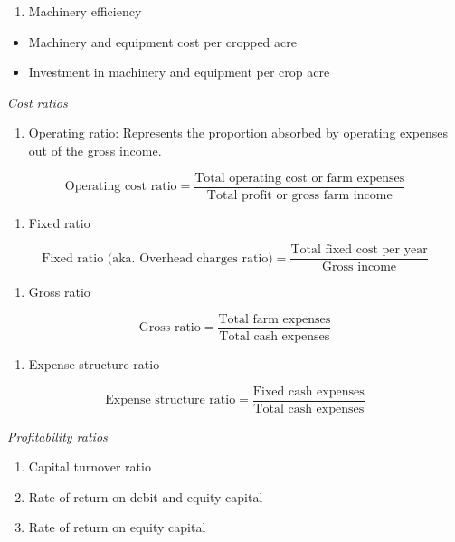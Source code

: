\documentclass[
]{article}
\providecommand{\tightlist}{%
  \setlength{\itemsep}{0pt}\setlength{\parskip}{0pt}}
\begin{document}
\begin{enumerate}
\def\labelenumi{\arabic{enumi}.}
\setcounter{enumi}{2}
\tightlist
\item
  Machinery efficiency
\end{enumerate}

\begin{itemize}
\tightlist
\item
  Machinery and equipment cost per cropped acre
\item
  Investment in machinery and equipment per crop acre
\end{itemize}

\emph{Cost ratios}

\begin{enumerate}
\def\labelenumi{\arabic{enumi}.}
\tightlist
\item
  Operating ratio: Represents the proportion absorbed by operating expenses out of the gross income.
\end{enumerate}

\[\text{Operating cost ratio} = \frac{\text{Total operating cost or farm expenses}}{\text{Total profit or gross farm income}}\]

\begin{enumerate}
\def\labelenumi{\arabic{enumi}.}
\setcounter{enumi}{1}
\tightlist
\item
  Fixed ratio
\end{enumerate}

\[\text{Fixed ratio (aka. Overhead charges ratio)} = \frac{\text{Total fixed cost per year}}{\text{Gross income}}\]

\begin{enumerate}
\def\labelenumi{\arabic{enumi}.}
\setcounter{enumi}{2}
\tightlist
\item
  Gross ratio
\end{enumerate}

\[\text{Gross ratio} = \frac{\text{Total farm expenses}}{\text{Total cash expenses}}\]

\begin{enumerate}
\def\labelenumi{\arabic{enumi}.}
\setcounter{enumi}{3}
\tightlist
\item
  Expense structure ratio
\end{enumerate}

\[\text{Expense structure ratio} = \frac{\text{Fixed cash expenses}}{\text{Total cash expenses}}\]

\emph{Profitability ratios}

\begin{enumerate}
\def\labelenumi{\arabic{enumi}.}
\tightlist
\item
  Capital turnover ratio
\item
  Rate of return on debit and equity capital
\item
  Rate of return on equity capital
\end{enumerate}
\end{document}
